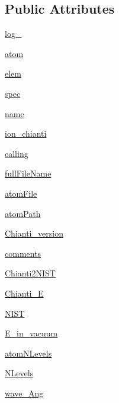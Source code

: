 \subsection*{Public Attributes}
\begin{DoxyCompactItemize}
\item 
\hyperlink{classpyneb_1_1utils_1_1pn__chianti_1_1___atom_chianti_a949f340c2041435c590ca066e2797e7d}{log\+\_\+}
\item 
\hyperlink{classpyneb_1_1utils_1_1pn__chianti_1_1___atom_chianti_a168acbb7ea238fb41299616a512d487c}{atom}
\item 
\hyperlink{classpyneb_1_1utils_1_1pn__chianti_1_1___atom_chianti_abe30b15c08f41bbb5c548c197977293a}{elem}
\item 
\hyperlink{classpyneb_1_1utils_1_1pn__chianti_1_1___atom_chianti_a12c7570333087fefa72763dd77a81379}{spec}
\item 
\hyperlink{classpyneb_1_1utils_1_1pn__chianti_1_1___atom_chianti_a7471c40b97108627573a9814cde6feec}{name}
\item 
\hyperlink{classpyneb_1_1utils_1_1pn__chianti_1_1___atom_chianti_a97865c9f8fcd274072335cc71fc746a3}{ion\+\_\+chianti}
\item 
\hyperlink{classpyneb_1_1utils_1_1pn__chianti_1_1___atom_chianti_af0303fd3e5fd4db39d3d1cdf62b2e4bc}{calling}
\item 
\hyperlink{classpyneb_1_1utils_1_1pn__chianti_1_1___atom_chianti_ac091a3412fff7c4af350dbbe6b604082}{full\+File\+Name}
\item 
\hyperlink{classpyneb_1_1utils_1_1pn__chianti_1_1___atom_chianti_acf53db82cf11ffa5218615522a69dff2}{atom\+File}
\item 
\hyperlink{classpyneb_1_1utils_1_1pn__chianti_1_1___atom_chianti_aaf24255765203c5d7650a7e7fc0f888d}{atom\+Path}
\item 
\hyperlink{classpyneb_1_1utils_1_1pn__chianti_1_1___atom_chianti_a56253efc79815d86493f5753ff9c5b72}{Chianti\+\_\+version}
\item 
\hyperlink{classpyneb_1_1utils_1_1pn__chianti_1_1___atom_chianti_afebb1605835d41af3a3078038475913a}{comments}
\item 
\hyperlink{classpyneb_1_1utils_1_1pn__chianti_1_1___atom_chianti_af40dabefe9f067611af9696725412980}{Chianti2\+N\+I\+S\+T}
\item 
\hyperlink{classpyneb_1_1utils_1_1pn__chianti_1_1___atom_chianti_ad3eb8ed7f4cb58a7806dd820b22f3d37}{Chianti\+\_\+\+E}
\item 
\hyperlink{classpyneb_1_1utils_1_1pn__chianti_1_1___atom_chianti_a1e879cf028a221b9ce7908eabf570641}{N\+I\+S\+T}
\item 
\hyperlink{classpyneb_1_1utils_1_1pn__chianti_1_1___atom_chianti_a0f18a10053d8b91b233a17e586760326}{E\+\_\+in\+\_\+vacuum}
\item 
\hyperlink{classpyneb_1_1utils_1_1pn__chianti_1_1___atom_chianti_a785ebfaa736f8db0aa4755a0447da689}{atom\+N\+Levels}
\item 
\hyperlink{classpyneb_1_1utils_1_1pn__chianti_1_1___atom_chianti_ab23fbd744cdeaa1e09454f014db040dc}{N\+Levels}
\item 
\hyperlink{classpyneb_1_1utils_1_1pn__chianti_1_1___atom_chianti_aca46b2e32f9bc1412824ea3998fbe97f}{wave\+\_\+\+Ang}
\end{DoxyCompactItemize}
